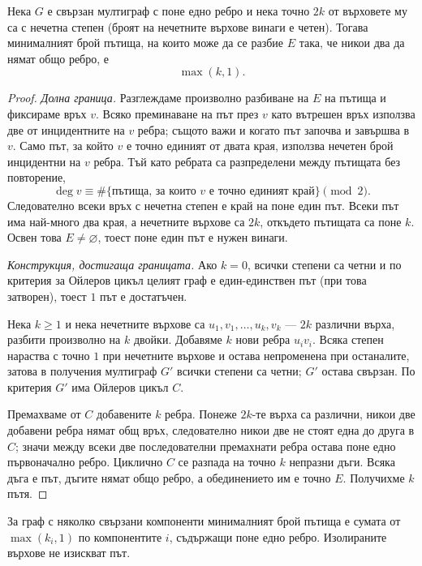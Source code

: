 \begin{keythm}
Нека $G$ е свързан мултиграф с поне едно ребро и нека точно $2k$ от върховете му
са с нечетна степен (броят на нечетните върхове винаги е четен). Тогава
минималният брой пътища, на които може да се разбие $E$ така, че никои два да
нямат общо ребро, е
\[
\max(k,1).
\]
\end{keythm}

\begin{proof}
\emph{Долна граница.} Разглеждаме произволно разбиване на $E$ на пътища и
фиксираме връх $v$. Всяко преминаване на път през $v$ като вътрешен връх
използва две от инцидентните на $v$ ребра; същото важи и когато път започва и
завършва в $v$. Само път, за който $v$ е точно единият от двата края, използва
нечетен брой инцидентни на $v$ ребра. Тъй като ребрата са разпределени между
пътищата без повторение,
\[
\deg v\equiv\#\{\text{пътища, за които } v \text{ е точно единият край}\}\pmod 2 .
\]
Следователно всеки връх с нечетна степен е край на поне един път. Всеки път има
най-много два края, а нечетните върхове са $2k$, откъдето пътищата са поне $k$.
Освен това $E\ne\varnothing$, тоест поне един път е нужен винаги.

\emph{Конструкция, достигаща границата.} Ако $k=0$, всички степени са четни и по
критерия за Ойлеров цикъл целият граф е един-единствен път (при това затворен),
тоест $1$ път е достатъчен.

Нека $k\geq 1$ и нека нечетните върхове са $u_1,v_1,\ldots,u_k,v_k$ --- $2k$
различни върха, разбити произволно на $k$ двойки. Добавяме $k$ нови ребра
$u_iv_i$. Всяка степен нараства с точно $1$ при нечетните върхове и остава
непроменена при останалите, затова в получения мултиграф $G'$ всички степени са
четни; $G'$ остава свързан. По критерия $G'$ има Ойлеров цикъл $C$.

Премахваме от $C$ добавените $k$ ребра. Понеже $2k$-те върха са различни, никои
две добавени ребра нямат общ връх, следователно никои две не стоят една до друга
в $C$; значи между всеки две последователни премахнати ребра остава поне едно
първоначално ребро. Циклично $C$ се разпада на точно $k$ непразни дъги. Всяка
дъга е път, дъгите нямат общо ребро, а обединението им е точно $E$. Получихме
$k$ пътя.
\end{proof}

\begin{cor}
За граф с няколко свързани компоненти минималният брой пътища е сумата от
$\max(k_i,1)$ по компонентите $i$, съдържащи поне едно ребро. Изолираните
върхове не изискват път.
\end{cor}

